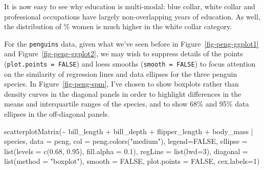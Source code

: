 \documentclass[
  letterpaper,
  10pt,
  krantz2]{krantz}
\makeatletter
\newenvironment{Shaded}{\begin{snugshade}}{\end{snugshade}}
\newcommand{\AttributeTok}[1]{\textcolor[rgb]{0.40,0.45,0.13}{#1}}
\newcommand{\ConstantTok}[1]{\textcolor[rgb]{0.56,0.35,0.01}{#1}}
\newcommand{\DecValTok}[1]{\textcolor[rgb]{0.68,0.00,0.00}{#1}}
\newcommand{\FloatTok}[1]{\textcolor[rgb]{0.68,0.00,0.00}{#1}}
\newcommand{\FunctionTok}[1]{\textcolor[rgb]{0.28,0.35,0.67}{#1}}
\newcommand{\NormalTok}[1]{\textcolor[rgb]{0.00,0.23,0.31}{#1}}
\newcommand{\SpecialCharTok}[1]{\textcolor[rgb]{0.37,0.37,0.37}{#1}}
\newcommand{\StringTok}[1]{\textcolor[rgb]{0.13,0.47,0.30}{#1}}
\newenvironment{kframe}{%
  \medskip{}
  \setlength{\fboxsep}{.8em}
  \def\at@end@of@kframe{}%
  \ifinner\ifhmode%
  \def\at@end@of@kframe{\end{minipage}}%
  \begin{minipage}{\columnwidth}%
  \fi\fi%
  \def\FrameCommand##1{\hskip\@totalleftmargin \hskip-\fboxsep
  \colorbox{shadecolor}{##1}\hskip-\fboxsep
      \hskip-\linewidth \hskip-\@totalleftmargin \hskip\columnwidth}%
  \MakeFramed {\advance\hsize-\width
    \@totalleftmargin\z@ \linewidth\hsize
    \@setminipage}}%
{\par\unskip\endMakeFramed%
  \at@end@of@kframe}
\renewenvironment{Shaded}{\begin{kframe}}{\end{kframe}}
\makeatother
\begin{document}
It is now easy to see why education is multi-modal: blue collar, white
collar and professional occupations have largely non-overlapping years
of education. As well, the distribution of \% women is much higher in
the white collar category.

For the \texttt{penguins} data, given what we've seen before in
Figure~\ref{fig-peng-ggplot1} and Figure~\ref{fig-peng-ggplot2}, we may
wish to suppress details of the points (\texttt{plot.points\ =\ FALSE})
and loess smooths (\texttt{smooth\ =\ FALSE}) to focus attention on the
similarity of regression lines and data ellipses for the three penguin
species. In Figure~\ref{fig-peng-spm}, I've chosen to show boxplots
rather than density curves in the diagonal panels in order to highlight
differences in the means and interquartile ranges of the species, and to
show 68\% and 95\% data ellipses in the off-diagonal panels.

\begin{Shaded}
\begin{Highlighting}[]
\FunctionTok{scatterplotMatrix}\NormalTok{(}\SpecialCharTok{\textasciitilde{}}\NormalTok{ bill\_length }\SpecialCharTok{+}\NormalTok{ bill\_depth }\SpecialCharTok{+}\NormalTok{ flipper\_length }\SpecialCharTok{+}\NormalTok{ body\_mass }\SpecialCharTok{|}\NormalTok{ species,}
  \AttributeTok{data =}\NormalTok{ peng, }
  \AttributeTok{col =} \FunctionTok{peng.colors}\NormalTok{(}\StringTok{"medium"}\NormalTok{), }
  \AttributeTok{legend=}\ConstantTok{FALSE}\NormalTok{,}
  \AttributeTok{ellipse =} \FunctionTok{list}\NormalTok{(}\AttributeTok{levels =} \FunctionTok{c}\NormalTok{(}\FloatTok{0.68}\NormalTok{, }\FloatTok{0.95}\NormalTok{), }
                 \AttributeTok{fill.alpha =} \FloatTok{0.1}\NormalTok{),}
  \AttributeTok{regLine =} \FunctionTok{list}\NormalTok{(}\AttributeTok{lwd=}\DecValTok{3}\NormalTok{),}
  \AttributeTok{diagonal =} \FunctionTok{list}\NormalTok{(}\AttributeTok{method =} \StringTok{"boxplot"}\NormalTok{),}
  \AttributeTok{smooth =} \ConstantTok{FALSE}\NormalTok{,}
  \AttributeTok{plot.points =} \ConstantTok{FALSE}\NormalTok{,}
  \AttributeTok{cex.labels=}\DecValTok{1}\NormalTok{) }
\end{Highlighting}
\end{Shaded}
\end{document}

